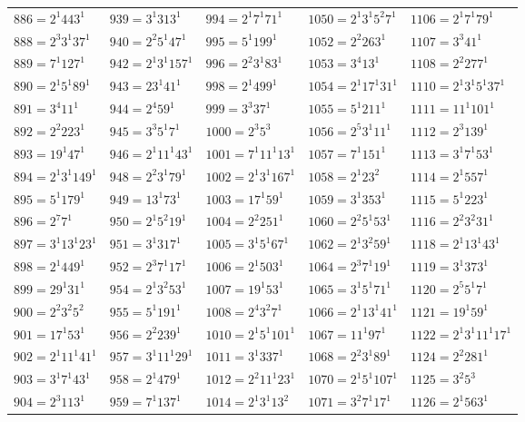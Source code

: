 {\begin{longtable}[c]{*{5}{l}}
$886=2^{1}443^{1}$&$939=3^{1}313^{1}$&$994=2^{1}7^{1}71^{1}$&$1050=2^{1}3^{1}5^{2}7^{1}$&$1106=2^{1}7^{1}79^{1}$\\
$888=2^{3}3^{1}37^{1}$&$940=2^{2}5^{1}47^{1}$&$995=5^{1}199^{1}$&$1052=2^{2}263^{1}$&$1107=3^{3}41^{1}$\\
$889=7^{1}127^{1}$&$942=2^{1}3^{1}157^{1}$&$996=2^{2}3^{1}83^{1}$&$1053=3^{4}13^{1}$&$1108=2^{2}277^{1}$\\
$890=2^{1}5^{1}89^{1}$&$943=23^{1}41^{1}$&$998=2^{1}499^{1}$&$1054=2^{1}17^{1}31^{1}$&$1110=2^{1}3^{1}5^{1}37^{1}$\\
$891=3^{4}11^{1}$&$944=2^{4}59^{1}$&$999=3^{3}37^{1}$&$1055=5^{1}211^{1}$&$1111=11^{1}101^{1}$\\
$892=2^{2}223^{1}$&$945=3^{3}5^{1}7^{1}$&$1000=2^{3}5^{3}$&$1056=2^{5}3^{1}11^{1}$&$1112=2^{3}139^{1}$\\
$893=19^{1}47^{1}$&$946=2^{1}11^{1}43^{1}$&$1001=7^{1}11^{1}13^{1}$&$1057=7^{1}151^{1}$&$1113=3^{1}7^{1}53^{1}$\\
$894=2^{1}3^{1}149^{1}$&$948=2^{2}3^{1}79^{1}$&$1002=2^{1}3^{1}167^{1}$&$1058=2^{1}23^{2}$&$1114=2^{1}557^{1}$\\
$895=5^{1}179^{1}$&$949=13^{1}73^{1}$&$1003=17^{1}59^{1}$&$1059=3^{1}353^{1}$&$1115=5^{1}223^{1}$\\
$896=2^{7}7^{1}$&$950=2^{1}5^{2}19^{1}$&$1004=2^{2}251^{1}$&$1060=2^{2}5^{1}53^{1}$&$1116=2^{2}3^{2}31^{1}$\\
$897=3^{1}13^{1}23^{1}$&$951=3^{1}317^{1}$&$1005=3^{1}5^{1}67^{1}$&$1062=2^{1}3^{2}59^{1}$&$1118=2^{1}13^{1}43^{1}$\\
$898=2^{1}449^{1}$&$952=2^{3}7^{1}17^{1}$&$1006=2^{1}503^{1}$&$1064=2^{3}7^{1}19^{1}$&$1119=3^{1}373^{1}$\\
$899=29^{1}31^{1}$&$954=2^{1}3^{2}53^{1}$&$1007=19^{1}53^{1}$&$1065=3^{1}5^{1}71^{1}$&$1120=2^{5}5^{1}7^{1}$\\
$900=2^{2}3^{2}5^{2}$&$955=5^{1}191^{1}$&$1008=2^{4}3^{2}7^{1}$&$1066=2^{1}13^{1}41^{1}$&$1121=19^{1}59^{1}$\\
$901=17^{1}53^{1}$&$956=2^{2}239^{1}$&$1010=2^{1}5^{1}101^{1}$&$1067=11^{1}97^{1}$&$1122=2^{1}3^{1}11^{1}17^{1}$\\
$902=2^{1}11^{1}41^{1}$&$957=3^{1}11^{1}29^{1}$&$1011=3^{1}337^{1}$&$1068=2^{2}3^{1}89^{1}$&$1124=2^{2}281^{1}$\\
$903=3^{1}7^{1}43^{1}$&$958=2^{1}479^{1}$&$1012=2^{2}11^{1}23^{1}$&$1070=2^{1}5^{1}107^{1}$&$1125=3^{2}5^{3}$\\
$904=2^{3}113^{1}$&$959=7^{1}137^{1}$&$1014=2^{1}3^{1}13^{2}$&$1071=3^{2}7^{1}17^{1}$&$1126=2^{1}563^{1}$\\

\end{longtable}}
